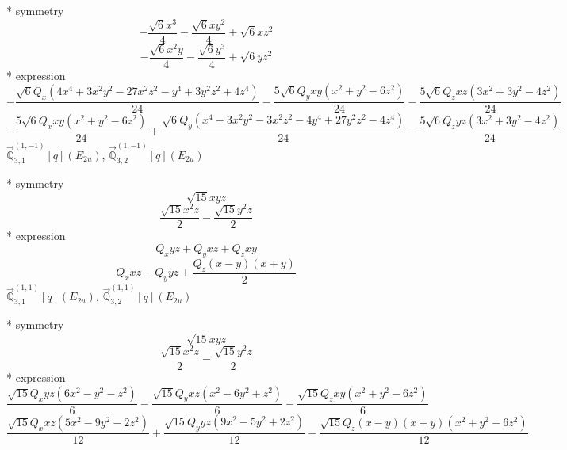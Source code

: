 \documentclass[fleqn,8pt]{jsarticle}
\begin{document}
\noindent\quad ** symmetry
\begin{dmath*}
- \frac{\sqrt{6} x^{3}}{4} - \frac{\sqrt{6} x y^{2}}{4} + \sqrt{6} x z^{2}
\end{dmath*}
\begin{dmath*}
- \frac{\sqrt{6} x^{2} y}{4} - \frac{\sqrt{6} y^{3}}{4} + \sqrt{6} y z^{2}
\end{dmath*}
\noindent\quad ** expression
\begin{dmath*}
- \frac{\sqrt{6} Q_{x} \left(4 x^{4} + 3 x^{2} y^{2} - 27 x^{2} z^{2} - y^{4} + 3 y^{2} z^{2} + 4 z^{4}\right)}{24} - \frac{5 \sqrt{6} Q_{y} x y \left(x^{2} + y^{2} - 6 z^{2}\right)}{24} - \frac{5 \sqrt{6} Q_{z} x z \left(3 x^{2} + 3 y^{2} - 4 z^{2}\right)}{24}
\end{dmath*}
\begin{dmath*}
- \frac{5 \sqrt{6} Q_{x} x y \left(x^{2} + y^{2} - 6 z^{2}\right)}{24} + \frac{\sqrt{6} Q_{y} \left(x^{4} - 3 x^{2} y^{2} - 3 x^{2} z^{2} - 4 y^{4} + 27 y^{2} z^{2} - 4 z^{4}\right)}{24} - \frac{5 \sqrt{6} Q_{z} y z \left(3 x^{2} + 3 y^{2} - 4 z^{2}\right)}{24}
\end{dmath*}
\noindent\quad $\vec{\mathbb{Q}}_{3,1}^{(1,-1)}[q](E_{2u})$, $\vec{\mathbb{Q}}_{3,2}^{(1,-1)}[q](E_{2u})$

\noindent\quad ** symmetry
\begin{dmath*}
\sqrt{15} x y z
\end{dmath*}
\begin{dmath*}
\frac{\sqrt{15} x^{2} z}{2} - \frac{\sqrt{15} y^{2} z}{2}
\end{dmath*}
\noindent\quad ** expression
\begin{dmath*}
Q_{x} y z + Q_{y} x z + Q_{z} x y
\end{dmath*}
\begin{dmath*}
Q_{x} x z - Q_{y} y z + \frac{Q_{z} \left(x - y\right) \left(x + y\right)}{2}
\end{dmath*}
\noindent\quad $\vec{\mathbb{Q}}_{3,1}^{(1,1)}[q](E_{2u})$, $\vec{\mathbb{Q}}_{3,2}^{(1,1)}[q](E_{2u})$

\noindent\quad ** symmetry
\begin{dmath*}
\sqrt{15} x y z
\end{dmath*}
\begin{dmath*}
\frac{\sqrt{15} x^{2} z}{2} - \frac{\sqrt{15} y^{2} z}{2}
\end{dmath*}
\noindent\quad ** expression
\begin{dmath*}
\frac{\sqrt{15} Q_{x} y z \left(6 x^{2} - y^{2} - z^{2}\right)}{6} - \frac{\sqrt{15} Q_{y} x z \left(x^{2} - 6 y^{2} + z^{2}\right)}{6} - \frac{\sqrt{15} Q_{z} x y \left(x^{2} + y^{2} - 6 z^{2}\right)}{6}
\end{dmath*}
\begin{dmath*}
\frac{\sqrt{15} Q_{x} x z \left(5 x^{2} - 9 y^{2} - 2 z^{2}\right)}{12} + \frac{\sqrt{15} Q_{y} y z \left(9 x^{2} - 5 y^{2} + 2 z^{2}\right)}{12} - \frac{\sqrt{15} Q_{z} \left(x - y\right) \left(x + y\right) \left(x^{2} + y^{2} - 6 z^{2}\right)}{12}
\end{dmath*}
\end{document}
